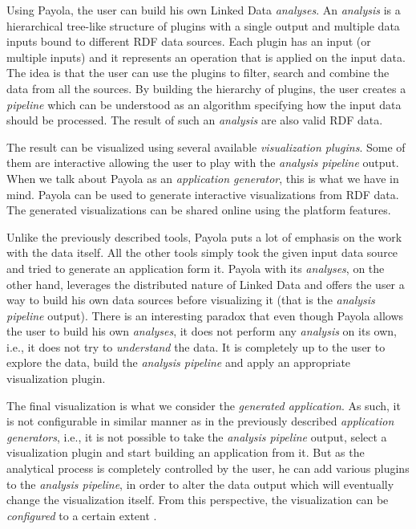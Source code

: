 Using Payola, the user can build his own Linked Data \emph{analyses}. An \emph{analysis} is a hierarchical tree-like structure of plugins with a single output and multiple data inputs bound to different RDF data sources. Each plugin has an input (or multiple inputs) and it represents an operation that is applied on the input data. The idea is that the user can use the plugins to filter, search and combine the data from all the sources. By building the hierarchy of plugins, the user creates a \emph{pipeline} which can be understood as an algorithm specifying how the input data should be processed. The result of such an \emph{analysis} are also valid RDF data.

The result can be visualized using several available \emph{visualization plugins}. Some of them are interactive allowing the user to play with the \emph{analysis pipeline} output. When we talk about Payola as an \emph{application generator}, this is what we have in mind. Payola can be used to generate interactive visualizations from RDF data. The generated visualizations can be shared online using the platform features.

Unlike the previously described tools, Payola puts a lot of emphasis on the work with the data itself. All the other tools simply took the given input data source and tried to generate an application form it. Payola with its \emph{analyses}, on the other hand, leverages the distributed nature of Linked Data and offers the user a way to build his own data sources before visualizing it (that is the \emph{analysis pipeline} output). There is an interesting paradox that even though Payola allows the user to build his own \emph{analyses}, it does not perform any \emph{analysis} on its own, i.e., it does not try to \emph{understand} the data. It is completely up to the user to explore the data, build the \emph{analysis pipeline} and apply an appropriate visualization plugin.
%
%
%

The final visualization is what we consider the \emph{generated application}. As such, it is not configurable in similar manner as in the previously described \emph{application generators}, i.e., it is not possible to take the \emph{analysis pipeline} output, select a visualization plugin and start building an application from it. But as the analytical process is completely controlled by the user, he can add various plugins to the \emph{analysis pipeline}, in order to alter the data output which will eventually change the visualization itself. From this perspective, the visualization can be \emph{configured} to a certain extent .

